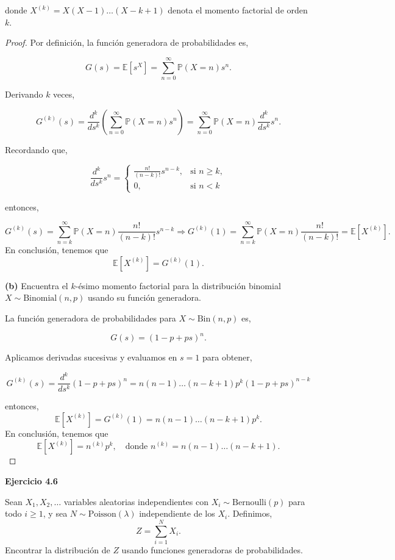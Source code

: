 \documentclass{article}
\begin{document}
donde \( X^{(k)} = X(X - 1)\dots(X - k + 1) \) denota el momento factorial de orden $k$.

\begin{proof}
Por definición, la función generadora de probabilidades es,

\[
G(s) = \mathbb{E}[s^X] = \sum_{n=0}^{\infty} \mathbb{P}(X = n) s^n.
\]

Derivando $k$ veces,

\[
G^{(k)}(s) = \frac{d^k}{ds^k} \left( \sum_{n=0}^\infty \mathbb{P}(X = n) s^n \right)
= \sum_{n=0}^{\infty} \mathbb{P}(X = n) \frac{d^k}{ds^k} s^n.
\]

Recordando que,

\[
\frac{d^k}{ds^k}s^n =
\begin{cases}
\frac{n!}{(n-k)!} s^{n-k}, & \text{si } n \geq k, \\
0, & \text{si } n < k
\end{cases}
\]

entonces,

\[
G^{(k)}(s) = \sum_{n=k}^\infty \mathbb{P}(X = n) \frac{n!}{(n - k)!} s^{n - k}
\Rightarrow G^{(k)}(1) = \sum_{n=k}^\infty \mathbb{P}(X = n) \frac{n!}{(n - k)!}
= \mathbb{E}[X^{(k)}].
\]
En conclusión, tenemos que
\[
\mathbb{E}[X^{(k)}] = G^{(k)}(1).
\]


\textbf{(b)} Encuentra el $k$-ésimo momento factorial para la distribución binomial $X \sim \text{Binomial}(n, p)$ usando su función generadora.


    La función generadora de probabilidades para $X \sim \text{Bin}(n, p)$ es,

\[
G(s) = (1 - p + ps)^n.
\]

Aplicamos derivadas sucesivas y evaluamos en $s = 1$ para obtener,

\[
G^{(k)}(s) = \frac{d^k}{ds^k}(1 - p + ps)^n = n(n-1)\dots(n-k+1)p^k(1 - p + ps)^{n - k}
\]

entonces,
\[
\mathbb{E}[X^{(k)}] = G^{(k)}(1) = n(n - 1) \dots (n - k + 1) p^k.
\]
En conclusión, tenemos que
\[
\mathbb{E}[X^{(k)}] = n^{(k)} p^k, \quad \text{donde } n^{(k)} = n(n-1)\dots(n-k+1).
\]
\end{proof}


\textbf{Ejercicio 4.6}

Sean $X_1, X_2, \dots$ variables aleatorias independientes con $X_i \sim \text{Bernoulli}(p)$ para todo $i \geq 1$, y sea $N \sim \text{Poisson}(\lambda)$ independiente de los $X_i$. Definimos,
\[
Z = \sum_{i = 1}^{N} X_i.
\]
Encontrar la distribución de $Z$ usando funciones generadoras de probabilidades.
\end{document}
